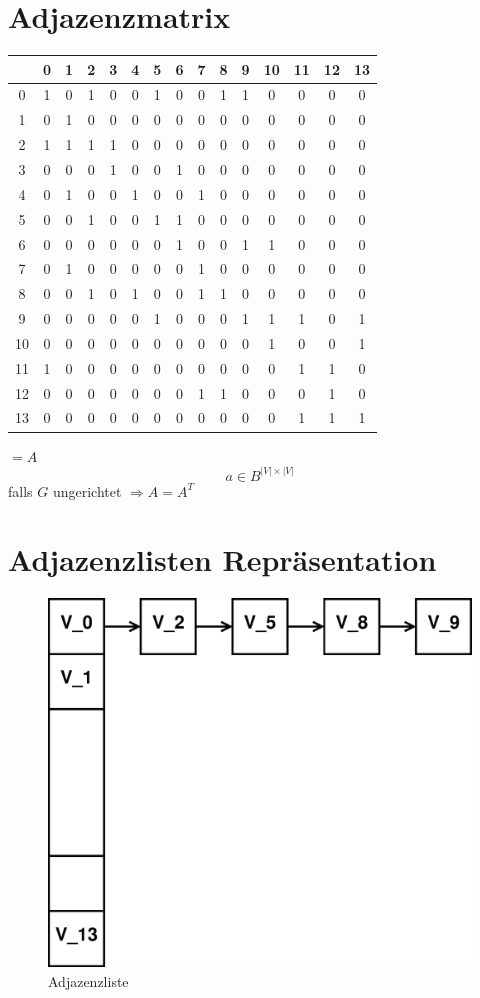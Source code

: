 \section{Adjazenzmatrix}
\begin{tabular}{|c|cccccccccccccc|}
	\hline
	  &0&1&2&3&4&5&6&7&8&9&10&11&12&13 \\ \hline
	 0&1&0&1&0&0&1&0&0&1&1& 0& 0& 0& 0 \\
	 1&0&1&0&0&0&0&0&0&0&0& 0& 0& 0& 0 \\
	 2&1&1&1&1&0&0&0&0&0&0& 0& 0& 0& 0 \\
	 3&0&0&0&1&0&0&1&0&0&0& 0& 0& 0& 0 \\ \hline
	 4&0&1&0&0&1&0&0&1&0&0& 0& 0& 0& 0 \\ 
	 5&0&0&1&0&0&1&1&0&0&0& 0& 0& 0& 0 \\
	 6&0&0&0&0&0&0&1&0&0&1& 1& 0& 0& 0 \\
	 7&0&1&0&0&0&0&0&1&0&0& 0& 0& 0& 0 \\ \hline
	 8&0&0&1&0&1&0&0&1&1&0& 0& 0& 0& 0 \\
	 9&0&0&0&0&0&1&0&0&0&1& 1& 1& 0& 1 \\
	10&0&0&0&0&0&0&0&0&0&0& 1& 0& 0& 1 \\
	11&1&0&0&0&0&0&0&0&0&0& 0& 1& 1& 0 \\ \hline
	12&0&0&0&0&0&0&0&1&1&0& 0& 0& 1& 0 \\
	13&0&0&0&0&0&0&0&0&0&0& 0& 1& 1& 1 \\ \hline
	
\end{tabular}$= A$
\[ a\in B^{|V|\times |V|} \]
falls $G$ ungerichtet $\Rightarrow A = A^T$
\section{Adjazenzlisten Repräsentation}
\begin{figure}[H]
\centering
\includegraphics[width=0.4\linewidth]{15/Grafik/Liste}
\caption{Adjazenzliste}
\label{fig:Liste}
\end{figure}


